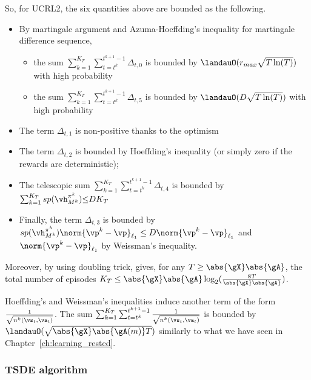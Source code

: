 So, for UCRL2, the six quantities above are bounded as the following.
\begin{itemize}
    \item By martingale argument and Azuma-Hoeffding's inequality for martingale difference sequence,
        \begin{itemize}
            \item the sum $\sum_{k=1}^{K_T}\sum_{t=t^k}^{t^{k+1}-1}\Delta_{t,0}$ is bounded by $\landauO(r_{max}\sqrt{T\ln(T)})$ with high probability
            \item the sum $\sum_{k=1}^{K_T}\sum_{t=t^k}^{t^{k+1}-1}\Delta_{t,5}$ is bounded by $\landauO(D\sqrt{T\ln(T)})$ with high probability
        \end{itemize}
    \item \label{it:optimism} The term $\Delta_{t,1}$ is non-positive thanks to the optimism
    \item The term $\Delta_{t,2}$ is bounded by Hoeffding's inequality (or simply zero if the rewards are deterministic);
    \item The telescopic sum $\sum_{k=1}^{K_T}\sum_{t=t^k}^{t^{k+1}-1} \Delta_{t,4}$ is bounded by $\sum_{k=1}^{K_T} sp(\vh^{\pi^k}_{M^k}){\le} DK_T$
    \item Finally, the term $\Delta_{t,3}$ is bounded by $sp(\vh^{\pi^k}_{M^k}) \norm{\vp^k-\vp}_{\ell_1}\le D\norm{\vp^k-\vp}_{\ell_1}$ and $\norm{\vp^k-\vp}_{\ell_1}$ by Weissman's inequality.
\end{itemize}
Moreover, by using doubling trick, \cite[Proposition~18]{jaksch2010near} gives, for any $T\ge \abs{\gX}\abs{\gA}$, the total number of episodes $K_T\le \abs{\gX}\abs{\gA}\log_2(\frac{8T}{\abs{\gX}\abs{\gA}})$.

Hoeffding's and Weissman's inequalities induce another term of the form $\frac{1}{\sqrt{n^k(\vs_t,\va_t)}}$.
The sum $\sum_{k=1}^{K_T}\sum_{t=t^k}^{t^{k+1}-1}\frac{1}{\sqrt{n^k(\vs_t,\va_t)}}$ is bounded by $\landauO(\sqrt{\abs{\gX}\abs{\gA(m)}T})$ similarly to what we have seen in Chapter~\ref{ch:learning_rested}. %

\subsubsection{TSDE algorithm}

